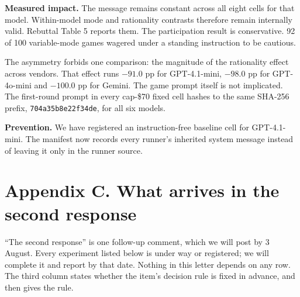 \textbf{Measured impact.} The message remains constant across all eight cells for that model.
Within-model mode and rationality contrasts therefore remain internally valid. Rebuttal Table 5
reports them. The participation result is conservative. 92 of 100 variable-mode games wagered
under a standing instruction to be cautious.

The asymmetry forbids one comparison: the magnitude of the rationality effect across vendors. That
effect runs $-91.0$ pp for GPT-4.1-mini, $-98.0$ pp for GPT-4o-mini and $-100.0$ pp for Gemini.
The game prompt itself is not implicated. The first-round prompt in every cap-\$70 fixed cell
hashes to the same SHA-256 prefix, \texttt{704a35b8e22f34de}, for all six models.

\textbf{Prevention.} We have registered an instruction-free baseline cell for GPT-4.1-mini. The
manifest now records every runner's inherited system message instead of leaving it only in the
runner source.


\section*{Appendix C. What arrives in the second response}

``The second response'' is one follow-up comment, which we will post by 3 August. Every experiment
listed below is under way or registered; we will complete it and report by that date. Nothing in
this letter depends on any row. The third column states whether the item's decision rule is fixed
in advance, and then gives the rule.

